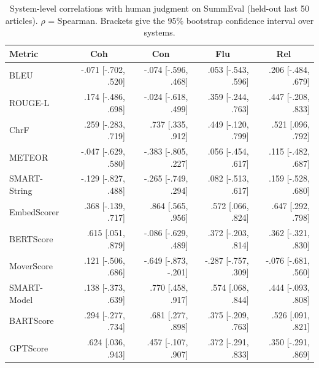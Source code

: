 \begin{table}[t]
\centering
\caption{System-level correlations with human judgment on SummEval (held-out last 50 articles). $\rho$ = Spearman. Brackets give the 95\% bootstrap confidence interval over systems.}
\label{tab:correlations_system}
\small
\linespread{1}\selectfont
\setlength{\tabcolsep}{4pt}
\begin{tabular}{@{}lrrrr@{}}
\toprule
Metric & \multicolumn{1}{c}{Coh} & \multicolumn{1}{c}{Con} & \multicolumn{1}{c}{Flu} & \multicolumn{1}{c}{Rel} \\
\midrule
BLEU & -.071 {\scriptsize [-.702, .520]} & -.074 {\scriptsize [-.596, .468]} & .053 {\scriptsize [-.543, .596]} & .206 {\scriptsize [-.484, .679]} \\
ROUGE-L & .174 {\scriptsize [-.486, .698]} & -.024 {\scriptsize [-.618, .499]} & .359 {\scriptsize [-.244, .763]} & .447 {\scriptsize [-.208, .833]} \\
ChrF & .259 {\scriptsize [-.283, .719]} & .737 {\scriptsize [.335, .912]} & .449 {\scriptsize [-.120, .799]} & .521 {\scriptsize [.096, .792]} \\
METEOR & -.047 {\scriptsize [-.629, .580]} & -.383 {\scriptsize [-.805, .227]} & .056 {\scriptsize [-.454, .617]} & .115 {\scriptsize [-.482, .687]} \\
SMART-String & -.129 {\scriptsize [-.827, .488]} & -.265 {\scriptsize [-.749, .294]} & .082 {\scriptsize [-.513, .617]} & .159 {\scriptsize [-.528, .680]} \\
EmbedScorer & .368 {\scriptsize [-.139, .717]} & .864 {\scriptsize [.565, .956]} & .572 {\scriptsize [.066, .824]} & .647 {\scriptsize [.292, .798]} \\
BERTScore & .615 {\scriptsize [.051, .879]} & -.086 {\scriptsize [-.629, .489]} & .372 {\scriptsize [-.203, .814]} & .362 {\scriptsize [-.321, .830]} \\
MoverScore & .121 {\scriptsize [-.506, .686]} & -.649 {\scriptsize [-.873, -.201]} & -.287 {\scriptsize [-.757, .309]} & -.076 {\scriptsize [-.681, .560]} \\
SMART-Model & .138 {\scriptsize [-.373, .639]} & .770 {\scriptsize [.458, .917]} & .574 {\scriptsize [.068, .844]} & .444 {\scriptsize [-.093, .808]} \\
BARTScore & .294 {\scriptsize [-.277, .734]} & .681 {\scriptsize [.277, .898]} & .375 {\scriptsize [-.209, .763]} & .526 {\scriptsize [.091, .821]} \\
GPTScore & .624 {\scriptsize [.036, .943]} & .457 {\scriptsize [-.107, .907]} & .372 {\scriptsize [-.291, .833]} & .350 {\scriptsize [-.291, .869]} \\

\end{tabular}
\end{table}
